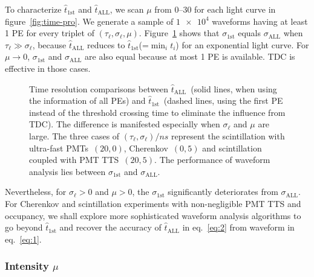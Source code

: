 To characterize $\hat{t}_\mathrm{1st}$ and $\hat{t}_\mathrm{ALL}$, we scan $\mu$ from \numrange{0}{30} for each light curve in figure~\ref{fig:time-pro}. We generate a sample of $\num[retain-unity-mantissa=false]{1e4}$ waveforms having at least 1 PE for every triplet of $(\tau_\ell, \sigma_\ell, \mu)$.  Figure~\ref{fig:reso-diff} shows that $\sigma_{\mathrm{1st}}$ equals $\sigma_{\mathrm{ALL}}$ when $\tau_\ell \gg \sigma_\ell$, because $\hat{t}_\mathrm{ALL}$ reduces to $\hat{t}_\mathrm{1st}$(=$\min_i t_i$) for an exponential light curve. For $\mu \to 0$, $\sigma_{\mathrm{1st}}$ and $\sigma_{\mathrm{ALL}}$ are also equal because at most 1 PE is available.  TDC is effective in those cases.

\begin{figure}[H]
  \centering
  \resizebox{1.0\textwidth}{!}{}
  \caption{\label{fig:reso-diff} Time resolution comparisons between $\hat{t}_{\mathrm{ALL}}$~(solid lines, when using the information of all PEs) and $\hat{t}_\mathrm{1st}$~(dashed lines, using the first PE instead of the threshold crossing time to eliminate the influence from TDC).  The difference is manifested especially when $\sigma_\ell$ and $\mu$ are large. The three cases of $(\tau_\ell, \sigma_\ell)/\si{ns}$ represent the scintillation with ultra-fast PMTs~$(20, 0)$, Cherenkov~$(0, 5)$ and scintillation coupled with PMT TTS~$(20, 5)$. The performance of waveform analysis lies between $\sigma_{\mathrm{1st}}$ and $\sigma_{\mathrm{ALL}}$. }
\end{figure}

Nevertheless, for $\sigma_\ell > 0$ and $\mu >0$, the $\sigma_{\mathrm{1st}}$ significantly deteriorates from $\sigma_{\mathrm{ALL}}$.  For Cherenkov and scintillation experiments with non-negligible PMT TTS and occupancy, we shall explore more sophisticated waveform analysis algorithms to go beyond $\hat{t}_{\mathrm{1st}}$ and recover the accuracy of $\hat{t}_\mathrm{ALL}$ in eq.~\eqref{eq:2} from waveform in eq.~\eqref{eq:1}.

\subsubsection{Intensity $\mu$}
\label{sec:intensity-mu}

